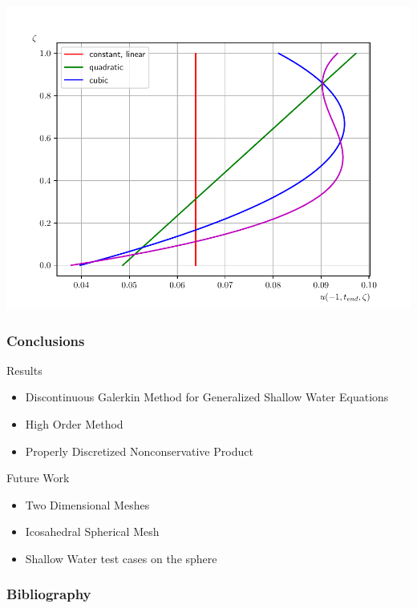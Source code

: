 \documentclass[10pt]{beamer}
\begin{document}
\begin{frame}
        \includegraphics[scale=0.29]{Figures/velocity_profile_-1_dam.pdf}
    \end{frame}

    \begin{frame}
      \frametitle{Conclusions}
      Results
      \begin{itemize}
        \item Discontinuous Galerkin Method for Generalized Shallow Water Equations
        \item High Order Method
        \item Properly Discretized Nonconservative Product
      \end{itemize}
      Future Work
      \begin{itemize}
        \item Two Dimensional Meshes
        \item Icosahedral Spherical Mesh
        \item Shallow Water test cases on the sphere
      \end{itemize}
    \end{frame}

    \begin{frame}[allowframebreaks]
      \frametitle{Bibliography}
      \nocite{*}
      \printbibliography{}
    \end{frame}
\end{document}
